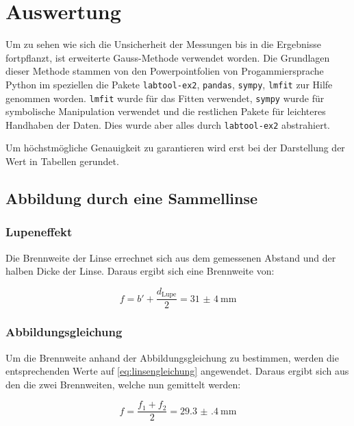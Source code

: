 \documentclass[12pt,english,ngerman]{scrartcl}
\begin{document}
\section{Auswertung}\label{sec:auswertung}

Um zu sehen wie sich die Unsicherheit der Messungen bis in die Ergebnisse
fortpflanzt, ist erweiterte Gauss-Methode verwendet worden. Die Grundlagen
dieser Methode stammen von den Powerpointfolien von
Progammiersprache Python im speziellen die Pakete \verb#labtool-ex2#,
\verb#pandas#, \verb#sympy#, \verb#lmfit# zur Hilfe genommen worden.
\verb#lmfit# wurde für das Fitten verwendet, \verb#sympy# wurde für symbolische
Manipulation verwendet und die restlichen Pakete für leichteres Handhaben der
Daten. Dies wurde aber alles durch \verb#labtool-ex2# abstrahiert.

Um höchstmögliche Genauigkeit zu garantieren wird erst bei der Darstellung der
Wert in Tabellen gerundet.

\subsection{Abbildung durch eine Sammellinse}

\subsubsection{Lupeneffekt}

Die Brennweite der Linse errechnet sich aus dem gemessenen Abstand und der
halben Dicke der Linse. Daraus ergibt sich eine Brennweite von:

\begin{equation}
	f = b'+ \frac{d_\text{Lupe}}{2} = \SI{31(4)}{\mm}
\end{equation}

\subsubsection{Abbildungsgleichung}

Um die Brennweite anhand der Abbildungsgleichung zu bestimmen, werden die
entsprechenden Werte auf \autoref{eq:linsengleichung} angewendet. Daraus ergibt
sich aus den die zwei Brennweiten, welche nun gemittelt werden:

\begin{equation}
	f = \frac{f_1+f_2}{2} = \SI{29.3(4)}{\mm}
\end{equation}
\end{document}
